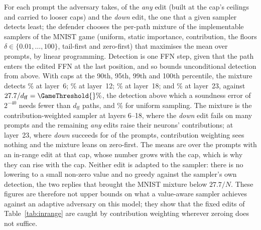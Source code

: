  For each prompt the adversary takes, of the \emph{any} edit (built at the
cap's ceilings and carried to looser caps) and the \emph{down} edit, the one that a given sampler detects least;
the defender chooses the per-path mixture of the implementable samplers of the MNIST game (uniform, static
importance, contribution, the floors $\delta\in\{0.01,\dots,100\}$, tail-first and zero-first) that maximises the
mean over prompts, by linear programming. Detection is one FFN step, given that the path enters the edited FFN at
the last position, and so bounds unconditional detection from above. With caps at the 90th, 95th, 99th and 100th
percentile, the mixture detects \GameCapsSix{}\% at layer~6; \GameCapsTwelve{}\% at layer~12;
\GameCapsEighteen{}\% at layer~18; and \GameCapsTwentyThree{}\% at layer~23, against $27.7/d_{\mathrm{ff}}
=\GameThreshold{}\%$, the detection above which a soundness error of $2^{-40}$ needs fewer than $d_{\mathrm{ff}}$ paths, and
\GameUniformAll{}\% for uniform sampling. The mixture is the contribution-weighted sampler at layers 6--18,
where the \emph{down} edit fails on many prompts and the remaining \emph{any} edits raise their neurons'
contributions; at layer~23, where \emph{down} succeeds for \InrangeDownLast{} of the \InrangePrompts{} prompts, contribution weighting sees
nothing and the mixture leans on zero-first. The means are over the prompts with an in-range edit at that cap,
whose number grows with the cap, which is why they can rise with the cap. Neither edit is adapted to the sampler: there is no lowering to a small non-zero value and no greedy
against the sampler's own detection, the two replies that brought the MNIST mixture below $27.7/N$. These figures
are therefore not upper bounds on what a value-aware sampler achieves against an adaptive adversary on this
model; they show that the fixed edits of Table~\ref{tab:inrange} are caught by contribution weighting wherever
zeroing does not suffice.

